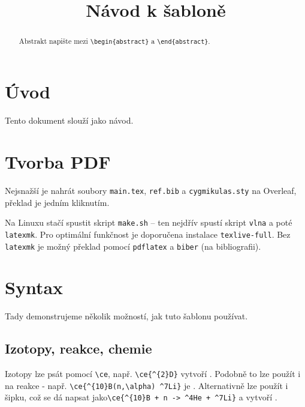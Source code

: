 \documentclass{cygclanek}
\begin{document}
\title{Návod k šabloně}



\maketitle
\begin{abstract}
    Abstrakt napište mezi \verb|\begin{abstract}| a \verb|\end{abstract}|.
\end{abstract}

\section{Úvod}

Tento dokument slouží jako návod. 

\section{Tvorba PDF}
Nejsnažší je nahrát soubory \verb|main.tex|, \verb|ref.bib| a \verb|cygmikulas.sty| na Overleaf, překlad je 
jedním kliknutím.

Na Linuxu stačí spustit skript \verb|make.sh| -- ten nejdřív spustí skript \verb|vlna| \cite{vlna} 
a poté \verb|latexmk|. Pro optimální funkčnost je doporučena instalace \verb|texlive-full|. 
Bez \verb|latexmk| je možný překlad pomocí \verb|pdflatex| a \verb|biber| (na bibliografii).



\section{Syntax}
Tady demonstrujeme několik možností, jak tuto šablonu používat.

\subsection{Izotopy, reakce, chemie}
Izotopy lze psát pomocí \verb|\ce|, např. \verb|\ce{^{2}D}| vytvoří . Podobně to lze použít i na 
reakce - např. \verb|\ce{^{10}B(n,\alpha) ^7Li}| je . Alternativně lze 
použít i šipku, což se dá napsat jako\newline\verb|\ce{^{10}B + n -> ^4He + ^7Li}| 
a vytvoří . 
\end{document}
